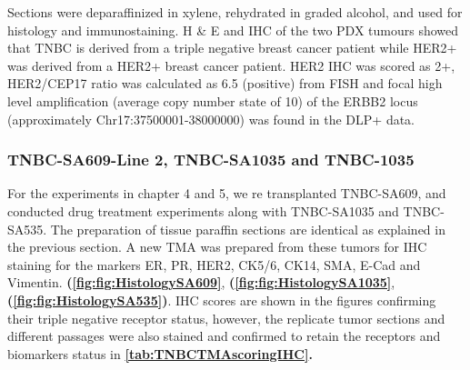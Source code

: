 Sections were deparaffinized in xylene, rehydrated in graded alcohol, and used for histology and immunostaining. 
H \& E and \ac{IHC}  of the two PDX tumours showed that TNBC is  derived from a triple negative breast cancer patient while HER2+ was derived from a HER2+ breast cancer patient. HER2 IHC was scored as 2+, HER2/CEP17 ratio was calculated as 6.5 (positive)\cite{ahn2020her2} from  \ac{FISH}  and focal high level amplification (average copy number state of 10) of the \ac{ERBB2} locus (approximately Chr17:37500001-38000000) was found in the DLP+ data.

\subsubsection{TNBC-SA609-Line 2, TNBC-SA1035 and TNBC-1035}
For the experiments in chapter 4 and 5, we re transplanted TNBC-SA609, and conducted drug treatment experiments along with TNBC-SA1035 and TNBC-SA535. The preparation of tissue paraffin sections are identical as explained in the previous section. A new TMA was prepared from these tumors for \ac{IHC} staining for the markers ER, PR, HER2, CK5/6, CK14, SMA, E-Cad and Vimentin.  \textbf{(\autoref{fig:fig:HistologySA609}},  \textbf{(\autoref{fig:fig:HistologySA1035}}, \textbf{(\autoref{fig:fig:HistologySA535})}. IHC scores are shown in the figures confirming their triple negative receptor status, however, the replicate tumor sections and different passages were also stained and confirmed to retain the receptors and biomarkers status in \textbf{\autoref{tab:TNBCTMAscoringIHC}.}



